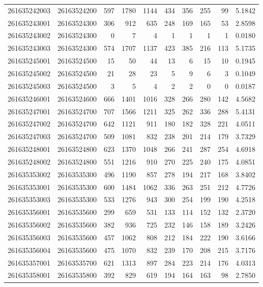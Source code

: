 \documentclass[
  11pt,
]{article}
\begin{document}
\begin{longtable}[t]{llrrrrrrrr}
261635242003 & 26163524200 & 597 & 1780 & 1144 & 434 & 356 & 255 & 99 & 5.1842\\
261635243001 & 26163524300 & 306 & 912 & 635 & 248 & 169 & 165 & 53 & 2.8598\\
261635243002 & 26163524300 & 0 & 7 & 4 & 1 & 1 & 1 & 1 & 0.0180\\
261635243003 & 26163524300 & 574 & 1707 & 1137 & 423 & 385 & 216 & 113 & 5.1735\\
261635245001 & 26163524500 & 15 & 50 & 44 & 13 & 6 & 15 & 10 & 0.1945\\
261635245002 & 26163524500 & 21 & 28 & 23 & 5 & 9 & 6 & 3 & 0.1049\\
261635245003 & 26163524500 & 3 & 5 & 4 & 2 & 2 & 0 & 0 & 0.0187\\
261635246001 & 26163524600 & 666 & 1401 & 1016 & 328 & 266 & 280 & 142 & 4.5682\\
261635247001 & 26163524700 & 707 & 1566 & 1211 & 325 & 262 & 336 & 288 & 5.4131\\
261635247002 & 26163524700 & 642 & 1121 & 911 & 180 & 182 & 328 & 221 & 4.0511\\
261635247003 & 26163524700 & 509 & 1081 & 832 & 238 & 201 & 214 & 179 & 3.7329\\
261635248001 & 26163524800 & 623 & 1370 & 1048 & 266 & 241 & 287 & 254 & 4.6918\\
261635248002 & 26163524800 & 551 & 1216 & 910 & 270 & 225 & 240 & 175 & 4.0851\\
261635353002 & 26163535300 & 496 & 1190 & 857 & 278 & 194 & 217 & 168 & 3.8402\\
261635353001 & 26163535300 & 600 & 1484 & 1062 & 336 & 263 & 251 & 212 & 4.7726\\
261635353003 & 26163535300 & 533 & 1276 & 943 & 300 & 254 & 199 & 190 & 4.2518\\
261635356001 & 26163535600 & 299 & 659 & 531 & 133 & 114 & 152 & 132 & 2.3720\\
261635356002 & 26163535600 & 382 & 936 & 725 & 232 & 146 & 158 & 189 & 3.2426\\
261635356003 & 26163535600 & 457 & 1062 & 808 & 212 & 184 & 222 & 190 & 3.6166\\
261635356004 & 26163535600 & 475 & 1070 & 832 & 239 & 170 & 208 & 215 & 3.7176\\
261635357001 & 26163535700 & 621 & 1313 & 897 & 284 & 223 & 214 & 176 & 4.0313\\
261635358001 & 26163535800 & 392 & 829 & 619 & 194 & 164 & 163 & 98 & 2.7850\\

\end{longtable}
\end{document}

